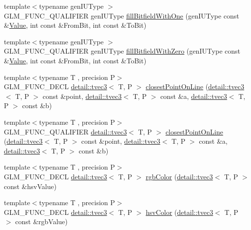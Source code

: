 \begin{DoxyCompactItemize}
\item 
{\footnotesize template$<$typename gen\+I\+U\+Type $>$ }\\G\+L\+M\+\_\+\+F\+U\+N\+C\+\_\+\+Q\+U\+A\+L\+I\+F\+I\+ER gen\+I\+U\+Type \hyperlink{group__gtx__bit_gafac2a9e0ef0d5d2fc4e569bff2b2f452}{fill\+Bitfield\+With\+One} (gen\+I\+U\+Type const \&\hyperlink{document_8h_a071cf97155ba72ac9a1fc4ad7e63d481}{Value}, int const \&From\+Bit, int const \&To\+Bit)
\item 
{\footnotesize template$<$typename gen\+I\+U\+Type $>$ }\\G\+L\+M\+\_\+\+F\+U\+N\+C\+\_\+\+Q\+U\+A\+L\+I\+F\+I\+ER gen\+I\+U\+Type \hyperlink{group__gtx__bit_ga0c514d45387003260783ba6a8a4f3285}{fill\+Bitfield\+With\+Zero} (gen\+I\+U\+Type const \&\hyperlink{document_8h_a071cf97155ba72ac9a1fc4ad7e63d481}{Value}, int const \&From\+Bit, int const \&To\+Bit)
\item 
{\footnotesize template$<$typename T , precision P$>$ }\\G\+L\+M\+\_\+\+F\+U\+N\+C\+\_\+\+D\+E\+CL \hyperlink{structglm_1_1detail_1_1tvec3}{detail\+::tvec3}$<$ T, P $>$ \hyperlink{group__gtx__closest__point_ga03a6d7e93590f5d45050f6dc7aa8bf8f}{closest\+Point\+On\+Line} (\hyperlink{structglm_1_1detail_1_1tvec3}{detail\+::tvec3}$<$ T, P $>$ const \&point, \hyperlink{structglm_1_1detail_1_1tvec3}{detail\+::tvec3}$<$ T, P $>$ const \&a, \hyperlink{structglm_1_1detail_1_1tvec3}{detail\+::tvec3}$<$ T, P $>$ const \&b)
\item 
{\footnotesize template$<$typename T , precision P$>$ }\\G\+L\+M\+\_\+\+F\+U\+N\+C\+\_\+\+Q\+U\+A\+L\+I\+F\+I\+ER \hyperlink{structglm_1_1detail_1_1tvec3}{detail\+::tvec3}$<$ T, P $>$ \hyperlink{group__gtx__closest__point_ga03a6d7e93590f5d45050f6dc7aa8bf8f}{closest\+Point\+On\+Line} (\hyperlink{structglm_1_1detail_1_1tvec3}{detail\+::tvec3}$<$ T, P $>$ const \&point, \hyperlink{structglm_1_1detail_1_1tvec3}{detail\+::tvec3}$<$ T, P $>$ const \&a, \hyperlink{structglm_1_1detail_1_1tvec3}{detail\+::tvec3}$<$ T, P $>$ const \&b)
\item 
{\footnotesize template$<$typename T , precision P$>$ }\\G\+L\+M\+\_\+\+F\+U\+N\+C\+\_\+\+D\+E\+CL \hyperlink{structglm_1_1detail_1_1tvec3}{detail\+::tvec3}$<$ T, P $>$ \hyperlink{group__gtx__color__space_gafe29cc37c2675aee66c9f9ae3e5e7294}{rgb\+Color} (\hyperlink{structglm_1_1detail_1_1tvec3}{detail\+::tvec3}$<$ T, P $>$ const \&hsv\+Value)
\item 
{\footnotesize template$<$typename T , precision P$>$ }\\G\+L\+M\+\_\+\+F\+U\+N\+C\+\_\+\+D\+E\+CL \hyperlink{structglm_1_1detail_1_1tvec3}{detail\+::tvec3}$<$ T, P $>$ \hyperlink{group__gtx__color__space_ga9d3d99c06af10403d317dec0cb655090}{hsv\+Color} (\hyperlink{structglm_1_1detail_1_1tvec3}{detail\+::tvec3}$<$ T, P $>$ const \&rgb\+Value)

\end{DoxyCompactItemize}
